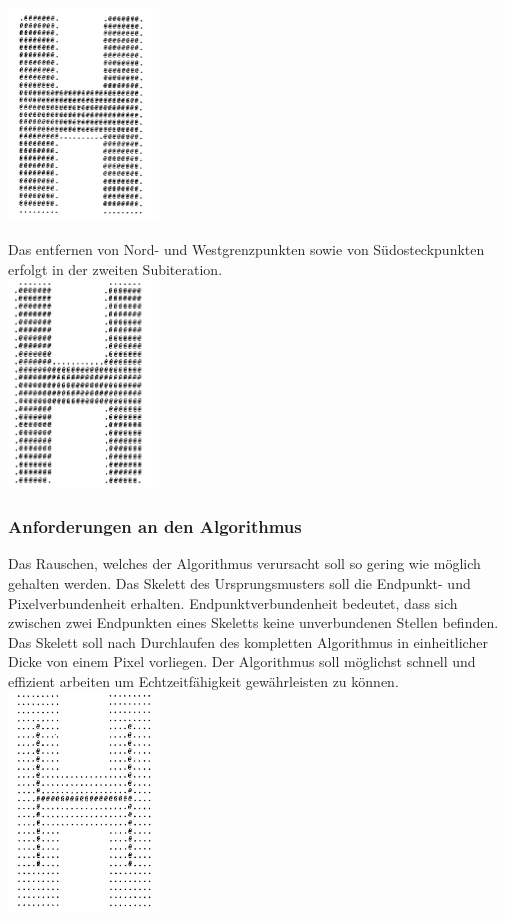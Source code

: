 \documentclass[appendixprefix,a4paper,bibliography=totoc,twoside=true,11pt,DIV=11,BCOR=6mm,headsepline,pointlessnumbers]{scrbook}
\begin{document}
\includegraphics[width=4cm]{Res/SuedOst.png}


Das entfernen von Nord- und Westgrenzpunkten sowie von Südosteckpunkten erfolgt in der zweiten Subiteration.\\

\includegraphics[width=4cm]{Res/NordWest.png}

\subsubsection{Anforderungen an den Algorithmus}

Das Rauschen, welches der Algorithmus verursacht soll so gering wie möglich gehalten werden.
Das Skelett des Ursprungsmusters soll die Endpunkt- und Pixelverbundenheit erhalten.
Endpunktverbundenheit bedeutet, dass sich zwischen zwei Endpunkten eines Skeletts keine unverbundenen Stellen befinden.
Das Skelett soll nach Durchlaufen des kompletten Algorithmus in einheitlicher Dicke von einem Pixel vorliegen.
Der Algorithmus soll möglichst schnell und effizient arbeiten um Echtzeitfähigkeit gewährleisten zu können.\\


\includegraphics[width=4cm]{Res/Skelett.png}
\end{document}
